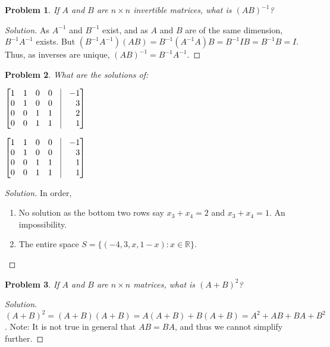 \documentclass{article}
\theoremstyle{mystyle}
\newtheorem{problem}{Problem}[section]
\begin{document}
\begin{problem}
If $A$ and $B$ are $n\times n$ invertible matrices, what is $(AB)^{-1}$?
\end{problem}
\begin{proof}[Solution]
As $A^{-1}$ and $B^{-1}$ exist, and as $A$ and $B$ are of the same dimension, $B^{-1}A^{-1}$ exists. But $(B^{-1}A^{-1})(AB) = B^{-1}(A^{-1}A)B = B^{-1}IB = B^{-1}B = I$. Thus, as inverses are unique, $(AB)^{-1} = B^{-1}A^{-1}$.
\end{proof}
\begin{problem}
What are the solutions of:
\begin{enumerate}
\begin{multicols}{2}
    \item $\begin{bmatrix*}[r] 1 & 1 & 0 & 0 & \vline & -1 \\ 0 & 1 & 0 & 0 & \vline & 3 \\ 0 & 0 & 1 & 1 & \vline & 2 \\ 0 & 0 & 1 & 1 & \vline & 1 \end{bmatrix*}$
    \item $\begin{bmatrix*}[r] 1 & 1 & 0 & 0 & \vline & -1 \\ 0 & 1 & 0 & 0 & \vline & 3 \\ 0 & 0 & 1 & 1 & \vline & 1 \\ 0 & 0 & 1 & 1 & \vline & 1 \end{bmatrix*}$
\end{multicols}
\end{enumerate}
\end{problem}
\begin{proof}[Solution]
In order,
\begin{enumerate}
    \item No solution as the bottom two rows say $x_3 + x_4 = 2$ and $x_3 + x_4 = 1$. An impossibility.
    \item The entire space $S = \{(-4,3,x,1-x):x\in \mathbb{R}\}$.
\end{enumerate}
\end{proof}
\begin{problem}
If $A$ and $B$ are $n\times n$ matrices, what is $(A+B)^2$?
\end{problem}
\begin{proof}[Solution]
$(A+B)^2 =(A+B)(A+B) = A(A+B)+B(A+B)=A^2+AB+BA+B^2$. Note: It is not true in general that $AB=BA$, and thus we cannot simplify further.
\end{proof}
\end{document}
